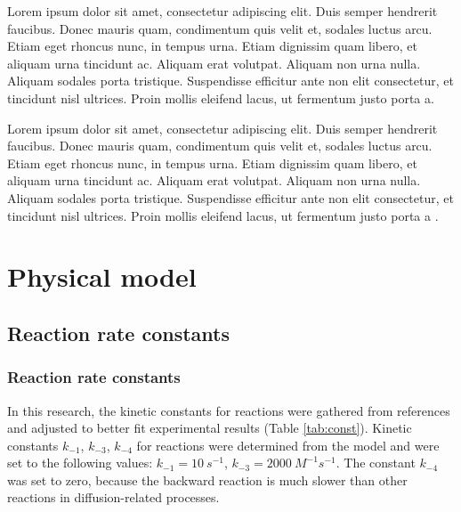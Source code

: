 Lorem ipsum dolor sit amet, consectetur adipiscing elit. Duis semper hendrerit faucibus. Donec mauris quam, condimentum quis velit et, sodales luctus arcu. Etiam eget rhoncus nunc, in tempus urna. Etiam dignissim quam libero, et aliquam urna tincidunt ac. Aliquam erat volutpat. Aliquam non urna nulla. Aliquam sodales porta tristique. Suspendisse efficitur ante non elit consectetur, et tincidunt nisl ultrices. Proin mollis eleifend lacus, ut fermentum justo porta a.

Lorem ipsum dolor sit amet, consectetur adipiscing elit. Duis semper hendrerit faucibus. Donec mauris quam, condimentum quis velit et, sodales luctus arcu. Etiam eget rhoncus nunc, in tempus urna. Etiam dignissim quam libero, et aliquam urna tincidunt ac. Aliquam erat volutpat. Aliquam non urna nulla. Aliquam sodales porta tristique. Suspendisse efficitur ante non elit consectetur, et tincidunt nisl ultrices. Proin mollis eleifend lacus, ut fermentum justo porta a \cite{smotkin1991dioxygen, bard2012scanning}.

\section{Physical model} \label{sec:reakc_phys}

\subsection{Reaction rate constants}  \label{subs:reakc_const}

\subsubsection{Reaction rate constants}  \label{subs:reakc_const2}

In this research, the kinetic constants for reactions were gathered from references  and adjusted to better fit experimental results (Table \ref{tab:const}). Kinetic constants $k_{-1}$, $k_{-3}$, $k_{-4}$ for reactions were determined from the model and were set to the following values: $k_{-1} = \SI{10}{s^{-1}}$, $k_{-3} = \SI{2000}{M^{-1}s^{-1}}$. The constant $k_{-4}$ was set to zero, because the backward reaction is much slower than other reactions in diffusion-related processes. 

